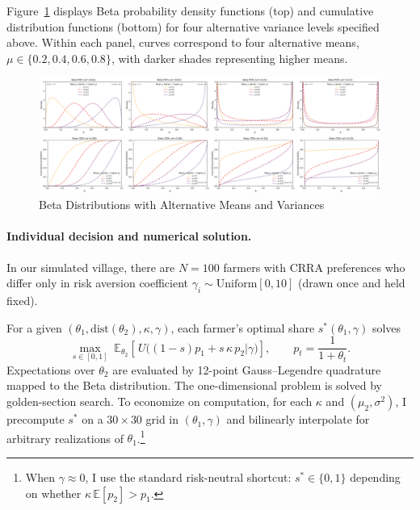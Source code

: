 Figure~\ref{fig:beta_pdf_cdf_grid} displays Beta probability density functions (top) and cumulative distribution functions (bottom) for four alternative variance levels specified above. Within each panel, curves correspond to four alternative means, $\mu \in \{0.2, 0.4, 0.6, 0.8\}$, with darker shades representing higher means.


\begin{figure}[ht!]
    \centering
    \includegraphics[width=\linewidth]{model_figures/beta_dist_PDF_CDF_grid_2x4.png}
    \caption{Beta Distributions with Alternative Means and Variances}
    \label{fig:beta_pdf_cdf_grid}
\end{figure}



\paragraph{Individual decision and numerical solution.}
In our simulated village, there are $N=100$ farmers with CRRA preferences who differ only in risk aversion coefficient $\gamma_i\sim \mathrm{Uniform}[0,10]$ (drawn once and held fixed).

For a given $(\theta_1,\text{dist}(\theta_2),\kappa,\gamma)$, each farmer's optimal share $s^*(\theta_1,\gamma)$ solves
\[
\max_{s\in[0,1]} \; \mathbb{E}_{\theta_2}\!\left[\,U\!\big((1-s)p_1+s\,\kappa\,p_2|\gamma\big)\right],
\qquad p_t=\frac{1}{1+\theta_t}.
\]
Expectations over $\theta_2$ are evaluated by 12-point Gauss--Legendre quadrature mapped to the Beta distribution. The one-dimensional problem is solved by golden-section search. To economize on computation, for each $\kappa$ and $(\mu_2,\sigma^2)$, I precompute $s^*$ on a $30\times 30$ grid in $(\theta_1,\gamma)$ and bilinearly interpolate for arbitrary realizations of $\theta_1$.\footnote{When $\gamma\approx 0$, I use the standard risk-neutral shortcut: $s^*\in\{0,1\}$ depending on whether $\kappa\,\mathbb{E}[p_2]>p_1$.}

